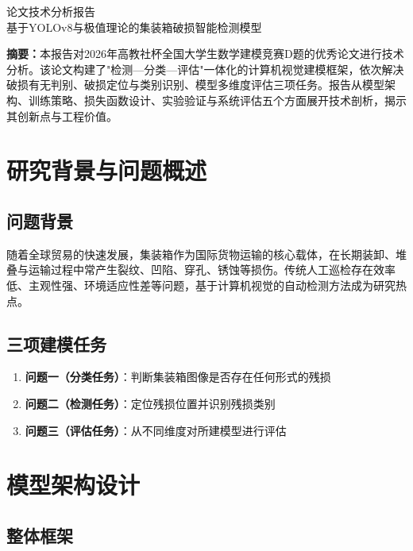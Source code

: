 \documentclass[12pt,a4paper]{ctexart}
\theoremstyle{cumcm}
\begin{document}
\begin{center}
{\heiti 论文技术分析报告}\\[0.5em]
{ 基于YOLOv8与极值理论的集装箱破损智能检测模型}
\end{center}

\vspace{1em}

\noindent\textbf{摘要：}本报告对2026年高教社杯全国大学生数学建模竞赛D题的优秀论文进行技术分析。该论文构建了"检测—分类—评估"一体化的计算机视觉建模框架，依次解决破损有无判别、破损定位与类别识别、模型多维度评估三项任务。报告从模型架构、训练策略、损失函数设计、实验验证与系统评估五个方面展开技术剖析，揭示其创新点与工程价值。

\section{研究背景与问题概述}

\subsection{问题背景}

随着全球贸易的快速发展，集装箱作为国际货物运输的核心载体，在长期装卸、堆叠与运输过程中常产生裂纹、凹陷、穿孔、锈蚀等损伤。传统人工巡检存在效率低、主观性强、环境适应性差等问题，基于计算机视觉的自动检测方法成为研究热点。

\subsection{三项建模任务}

\begin{enumerate}[leftmargin=2.2em,itemsep=2pt]
\item \textbf{问题一（分类任务）}：判断集装箱图像是否存在任何形式的残损
\item \textbf{问题二（检测任务）}：定位残损位置并识别残损类别
\item \textbf{问题三（评估任务）}：从不同维度对所建模型进行评估
\end{enumerate}

\section{模型架构设计}

\subsection{整体框架}
\end{document}
